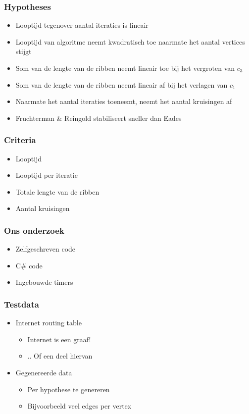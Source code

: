 \documentclass[16pt]{beamer}
\begin{document}
\begin{frame}
    \frametitle{Hypotheses}
    \begin{itemize}
        \item{Looptijd tegenover aantal iteraties is lineair}
        \item{Looptijd van algoritme neemt kwadratisch toe naarmate het aantal vertices stijgt}
        \item{Som van de lengte van de ribben neemt lineair toe bij het vergroten van $c_3$}
        \item{Som van de lengte van de ribben neemt lineair af bij het verlagen van $c_1$}
        \item{Naarmate het aantal iteraties toeneemt, neemt het aantal kruisingen af}
        \item{Fruchterman \& Reingold stabiliseert sneller dan Eades}
    \end{itemize}
\end{frame}

\begin{frame}
    \frametitle{Criteria}
    \begin{itemize}
        \item{Looptijd}
        \item{Looptijd per iteratie}
        \item{Totale lengte van de ribben}
        \item{Aantal kruisingen}
    \end{itemize}
\end{frame}

\begin{frame}
    \frametitle{Ons onderzoek}
    \begin{itemize}
        \item{Zelfgeschreven code}
        \item{C\# code}
        \item{Ingebouwde timers}
    \end{itemize}
\end{frame}

\begin{frame}
    \frametitle{Testdata}
    \begin{itemize}
        \item{Internet routing table}
        \begin{itemize}
            \item{Internet is een graaf!}
            \item{.. Of een deel hiervan}
        \end{itemize}
        \item{Gegenereerde data}
        \begin{itemize}
            \item{Per hypothese te genereren}
            \item{Bijvoorbeeld veel edges per vertex}
        \end{itemize}
    \end{itemize}
\end{frame}
\end{document}
